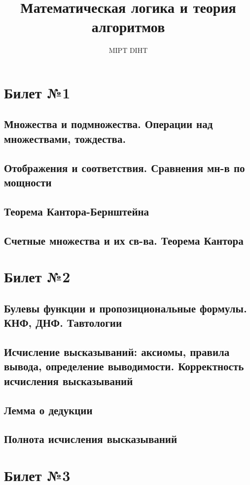 \documentclass[a4paper]{article}
\title{Математическая логика и теория алгоритмов}
\author{MIPT DIHT}
\theoremstyle{plain}
\theoremstyle{remark}
\theoremstyle{definition}
\begin{document}
\maketitle

\section{Билет №1}
\subsection{Множества и подмножества. Операции над множествами, тождества.}
\subsection{Отображения и соответствия. Сравнения мн-в по мощности}
\subsection{Теорема Кантора-Бернштейна}
\subsection{Счетные множества и их св-ва. Теорема Кантора}

\section{Билет №2}
\subsection{Булевы функции и пропозициональные формулы. КНФ, ДНФ. Тавтологии}
\subsection{Исчисление высказываний: аксиомы, правила вывода, определение выводимости. Корректность исчисления высказываний}
\subsection{Лемма о дедукции}
\subsection{Полнота исчисления высказываний}

\section{Билет №3}
\end{document}
